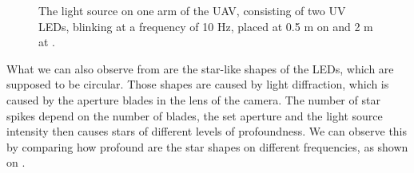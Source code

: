 \begin{figure}[htbp]
	\centering
	\caption{
  The light source on one arm of the UAV, consisting of two UV LEDs, blinking at a frequency of 10 Hz,
  placed at 0.5 m on  and 2 m at .
  }
	\label{fig:leds}
\end{figure}
What we can also observe from  are the star-like shapes of the LEDs, which are supposed to be circular.
Those shapes are caused by light diffraction, which is caused by the aperture blades in the lens of the camera. The number
of star spikes depend on the number of blades, the set aperture and the light source intensity then causes stars of different
levels of profoundness.\cite{lendermann2018computational} We can observe this by comparing how profound are the star shapes on different
frequencies, as shown on .

